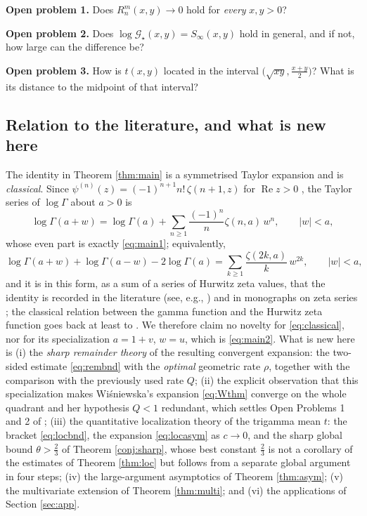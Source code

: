 \documentclass[11pt,a4paper]{amsart}
\theoremstyle{definition}
\newcommand{\Gs}{\mathcal{G}_{\star}}
\begin{document}
\smallskip
\noindent\textbf{Open problem 1.} Does $R^{m}_{n}(x,y)\to0$ hold for \emph{every} $x,y>0$?

\noindent\textbf{Open problem 2.} Does $\log\Gs(x,y)=S_{\infty}(x,y)$ hold in general, and
if not, how large can the difference be?

\noindent\textbf{Open problem 3.} How is $t(x,y)$ located in the interval
$\big(\sqrt{xy},\tfrac{x+y}{2}\big)$? What is its distance to the midpoint of that interval?
\normalsize

\subsection{Relation to the literature, and what is new here}
The identity in Theorem \ref{thm:main} is a symmetrised Taylor expansion and is
\emph{classical}. Since $\psi^{(n)}(z)=(-1)^{n+1}n!\,\zeta(n+1,z)$ for
$\operatorname{Re}z>0$ \cite[\S5.15]{DLMF}, the Taylor series of $\log\Gamma$ about $a>0$ is
\[
  \log\Gamma(a+w)=\log\Gamma(a)+\sum_{n\ge1}\frac{(-1)^{n}}{n}\zeta(n,a)\,w^{n},
  \qquad |w|<a ,
\]
whose even part is exactly \eqref{eq:main1}; equivalently,
\begin{equation}\label{eq:classical}
  \log\Gamma(a+w)+\log\Gamma(a-w)-2\log\Gamma(a)
   =\sum_{k\ge1}\frac{\zeta(2k,a)}{k}\,w^{2k},\qquad |w|<a ,
\end{equation}
and it is in this form, as a sum of a series of Hurwitz zeta values, that the identity is
recorded in the literature (see, e.g., \cite{Srivastava88}) and in monographs on zeta
series \cite{SrivastavaChoi01}; the classical relation between the gamma function and the
Hurwitz zeta function goes back at least to \cite{Berndt85}. We therefore claim no novelty
for \eqref{eq:classical}, nor for its specialization $a=1+v$, $w=u$, which is
\eqref{eq:main2}. What is new here is
(i) the \emph{sharp remainder theory} of the resulting convergent expansion: the two-sided
estimate \eqref{eq:rembnd} with the \emph{optimal} geometric rate $\rho$, together with the
comparison with the previously used rate $Q$; (ii) the explicit observation that this
specialization makes Wi\'sniewska's expansion \eqref{eq:Wthm} converge on the whole
quadrant and her hypothesis $Q<1$ redundant, which settles Open Problems 1 and 2 of
\cite{Wisniewska25}; (iii) the quantitative localization theory of the trigamma mean $t$:
the bracket \eqref{eq:locbnd}, the expansion \eqref{eq:locasym} as $c\to0$, and the sharp
global bound $\theta>\frac23$ of Theorem \ref{conj:sharp}, whose best constant $\frac23$ is
not a corollary of the estimates of Theorem \ref{thm:loc} but follows from a separate
global argument in four steps; (iv) the large-argument asymptotics of
Theorem \ref{thm:asym}; (v) the multivariate extension of Theorem \ref{thm:multi}; and
(vi) the applications of Section \ref{sec:app}.
\end{document}
